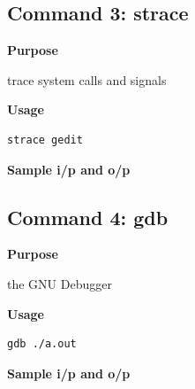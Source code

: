 \documentclass{article}
\begin{document}
\subsection{Command 3: strace} 
\textbf{Purpose}
\begin{flushleft}
trace system calls and signals
\end{flushleft}
\textbf{Usage}
\begin{verbatim}
strace gedit
\end{verbatim}
\textbf{Sample i/p and o/p}
\begin{figure}[H] 
\end{figure}
\subsection{Command 4: gdb} 
\textbf{Purpose}
\begin{flushleft}
the GNU Debugger
\end{flushleft}
\textbf{Usage}
\begin{verbatim}
gdb ./a.out
\end{verbatim}
\textbf{Sample i/p and o/p}
\begin{figure}[H] 
\end{figure}
\end{document}
